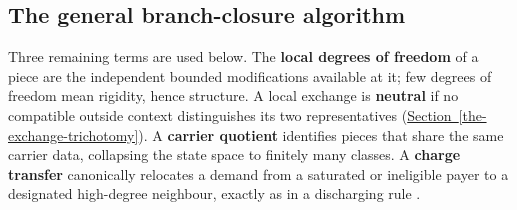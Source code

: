 \documentclass[
  11pt,
]{article}
\theoremstyle{definition}
\newcommand{\secref}[1]{\hyperref[#1]{Section~\ref*{#1}}}
\begin{document}
\subsection{The general branch-closure
algorithm}\label{the-general-branch-closure-algorithm}

Three remaining terms are used below. The \textbf{local degrees of
freedom} of a piece are the independent bounded modifications available
at it; few degrees of freedom mean rigidity, hence structure. A local
exchange is \textbf{neutral} if no compatible outside context
distinguishes its two representatives (\secref{the-exchange-trichotomy}). A \textbf{carrier
quotient} identifies pieces that share the same carrier data, collapsing
the state space to finitely many classes. A \textbf{charge transfer}
canonically relocates a demand from a saturated or ineligible payer to a
designated high-degree neighbour, exactly as in a discharging rule
\citep{cranston-west-2017-discharging}.
\end{document}
